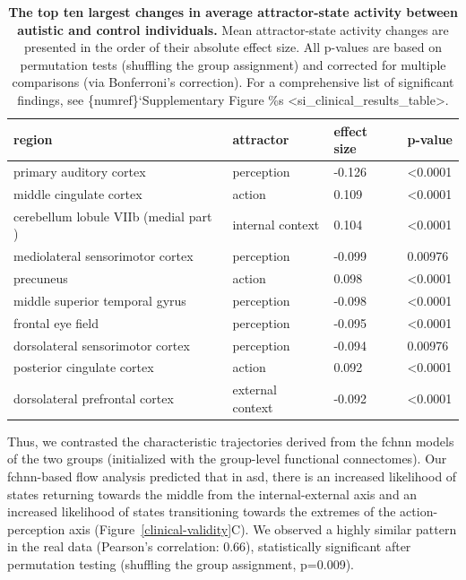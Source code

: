 \documentclass{article}
\begin{document}
\begin{table}
\centering
\caption[]{\textbf{The top ten largest changes in average attractor-state activity between autistic and control individuals.}  Mean attractor-state activity changes are presented in the order of their absolute effect size. All p-values are based on permutation tests (shuffling the group assignment) and corrected for multiple comparisons (via Bonferroni's correction). For a comprehensive list of significant findings, see \{numref\}`Supplementary Figure \%s \textless si\_clinical\_results\_table\textgreater .}
\label{tab-clinical-results}
\begin{tabular}{p{}p{}p{}p{}}
\toprule
region & attractor & effect size & p-value \\
\hline
primary auditory cortex & perception & -0.126 & \textless 0.0001 \\
mid\acrshort{dl}e cingulate cortex & action & 0.109 & \textless 0.0001 \\
cerebellum lobule VIIb (medial part  ) & internal context & 0.104 & \textless 0.0001 \\
mediolateral sensorimotor cortex & perception & -0.099 & 0.00976 \\
precuneus & action & 0.098 & \textless 0.0001 \\
mid\acrshort{dl}e superior temporal gyrus & perception & -0.098 & \textless 0.0001 \\
frontal eye field & perception & -0.095 & \textless 0.0001 \\
dorsolateral sensorimotor cortex & perception & -0.094 & 0.00976 \\
posterior cingulate cortex & action & 0.092 & \textless 0.0001 \\
dorsolateral prefrontal cortex & external context & -0.092 & \textless 0.0001 \\
\bottomrule
\end{tabular}
\end{table}

Thus, we contrasted the characteristic trajectories derived from the \acrshort{fchnn} models of the two groups (initialized with the group-level functional connectomes). Our \acrshort{fchnn}-based flow analysis predicted that in \acrshort{asd}, there is an increased likelihood of states returning towards the mid\acrshort{dl}e from the internal-external axis and an increased likelihood of states transitioning towards the extremes of the action-perception axis (Figure~\ref{clinical-validity}C). We observed a highly similar pattern in the real data (Pearson's correlation: 0.66), statistically significant after permutation testing (shuffling the group assignment, p=0.009).
\end{document}
